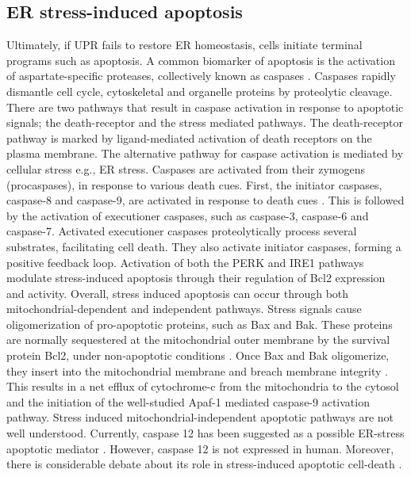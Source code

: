 \documentclass[fleqn,10pt]{wlscirep}
\begin{document}
\subsection*{ER stress-induced apoptosis}
Ultimately, if UPR fails to restore ER homeostasis, cells initiate terminal programs such as apoptosis. A common biomarker of apoptosis is the activation of aspartate-specific proteases, collectively known as caspases \cite{alnemri1996hic}. Caspases rapidly dismantle cell cycle, cytoskeletal and organelle proteins by proteolytic cleavage. There are two pathways that result in caspase activation in response to apoptotic signals; the death-receptor and the stress mediated pathways. The death-receptor pathway is marked by ligand-mediated activation of death receptors on the plasma membrane. The alternative pathway for caspase activation is mediated by cellular stress e.g., ER stress. Caspases are activated from their zymogens (procaspases), in response to various death cues. First, the initiator caspases, caspase-8 and caspase-9, are activated in response to death cues \cite{muzio1998ipm}. This is followed by the activation of executioner caspases, such as caspase-3, caspase-6 and caspase-7. Activated executioner caspases proteolytically process several substrates, facilitating cell death. They also activate initiator caspases, forming a positive feedback loop. Activation of both the PERK and IRE1 pathways modulate stress-induced apoptosis through their regulation of Bcl2 expression and activity. Overall, stress induced apoptosis can occur through both mitochondrial-dependent and independent pathways. Stress signals cause oligomerization of pro-apoptotic proteins, such as Bax and Bak. These proteins are normally sequestered at the mitochondrial outer membrane by the survival protein Bcl2, under non-apoptotic conditions \cite{wei2001proapoptotic}. Once Bax and Bak oligomerize, they insert into the mitochondrial membrane and breach membrane integrity \cite{nechushtan1999conformation}. This results in a net efflux of cytochrome-c from the mitochondria to the cytosol and the initiation of the well-studied Apaf-1 mediated caspase-9 activation pathway. Stress induced mitochondrial-independent apoptotic pathways are not well understood. Currently, caspase 12 has been suggested as a possible ER-stress apoptotic mediator \cite{szegezdi2006mediators, yoneda2001ace, nakagawa2000caspase}. However, caspase 12 is not expressed in human. Moreover, there is considerable debate about its role in stress-induced apoptotic cell-death \cite{Saleh:2006ys}.
\end{document}
